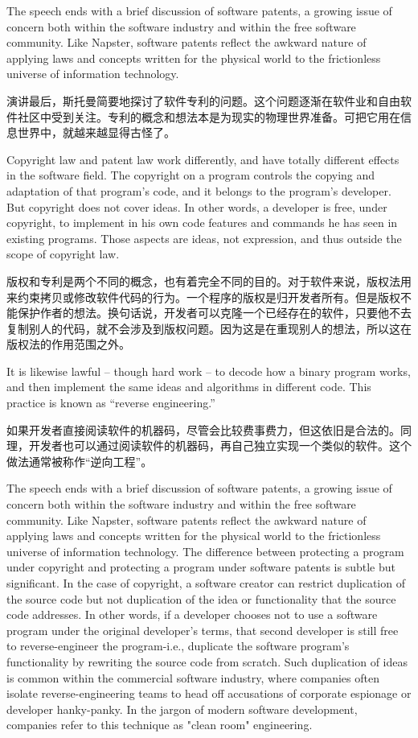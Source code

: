 \ifdefined\vtwo
\ifdefined\eng
The speech ends with a brief discussion of software patents, a growing issue of concern both within the software industry and within the free software community. Like Napster, software patents reflect the awkward nature of applying laws and concepts written for the physical world to the frictionless universe of information technology.
\fi

\ifdefined\chs
演讲最后，斯托曼简要地探讨了软件专利的问题。这个问题逐渐在软件业和自由软件社区中受到关注。专利的概念和想法本是为现实的物理世界准备。可把它用在信息世界中，就越来越显得古怪了。
\fi

\ifdefined\eng
Copyright law and patent law work differently, and have totally different effects in the software field.  The copyright on a program controls the copying and adaptation of that program's code, and it belongs to the program's developer.  But copyright does not cover ideas. In other words, a developer is free, under copyright, to implement in his own code features and commands he has seen in existing programs.  Those aspects are ideas, not expression, and thus outside the scope of copyright law.
\fi

\ifdefined\chs
版权和专利是两个不同的概念，也有着完全不同的目的。对于软件来说，版权法用来约束拷贝或修改软件代码的行为。一个程序的版权是归开发者所有。但是版权不能保护作者的想法。换句话说，开发者可以克隆一个已经存在的软件，只要他不去复制别人的代码，就不会涉及到版权问题。因为这是在重现别人的想法，所以这在版权法的作用范围之外。
\fi

\ifdefined\eng
It is likewise lawful -- though hard work -- to decode how a binary program works, and then implement the same ideas and algorithms in different code.  This practice is known as ``reverse engineering.''
\fi

\ifdefined\chs
如果开发者直接阅读软件的机器码，尽管会比较费事费力，但这依旧是合法的。同理，开发者也可以通过阅读软件的机器码，再自己独立实现一个类似的软件。这个做法通常被称作``逆向工程''。
\fi
\fi

\ifdefined\vone
\ifdefined\eng
The speech ends with a brief discussion of software patents, a growing issue of concern both within the software industry and within the free software community. Like Napster, software patents reflect the awkward nature of applying laws and concepts written for the physical world to the frictionless universe of information technology. The difference between protecting a program under copyright and protecting a program under software patents is subtle but significant. In the case of copyright, a software creator can restrict duplication of the source code but not duplication of the idea or functionality that the source code addresses. In other words, if a developer chooses not to use a software program under the original developer's terms, that second developer is still free to reverse-engineer the program-i.e., duplicate the software program's functionality by rewriting the source code from scratch. Such duplication of ideas is common within the commercial software industry, where companies often isolate reverse-engineering teams to head off accusations of corporate espionage or developer hanky-panky. In the jargon of modern software development, companies refer to this technique as "clean room" engineering. 
\fi

